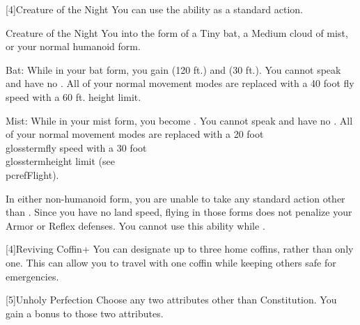            [4]{Creature of the Night} You can use the  ability as a standard action.
            \begin{magicalattuneability}{Creature of the Night}{}
                \rankline
                You  into the form of a Tiny bat, a Medium cloud of mist, or your normal humanoid form.
                \begin{raggeditemize}
                    \item Bat: While in your bat form, you gain  (120 ft.) and  (30 ft.).
                        You cannot speak and have no .
                        All of your normal movement modes are replaced with a 40 foot fly speed with a 60 ft. height limit.
                    \item Mist: While in your mist form, you become .
                        You cannot speak and have no .
                        All of your normal movement modes are replaced with a 20 foot \\glossterm{fly speed} with a 30 foot \\glossterm{height limit} (see \\pcref{Flight}).
                \end{raggeditemize}

                In either non-humanoid form, you are unable to take any standard action other than .
                Since you have no land speed, flying in those forms does not penalize your Armor or Reflex defenses.
                You cannot use this ability while \paralyzed.
            \end{magicalattuneability}

            [4]{Reviving Coffin+} You can designate up to three home coffins, rather than only one.
            This can allow you to travel with one coffin while keeping others safe for emergencies.

            [5]{Unholy Perfection} Choose any two attributes other than Constitution.
            You gain a  bonus to those two attributes.

